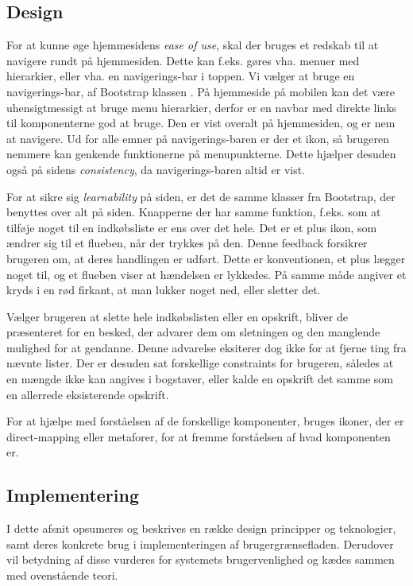 \subsection{Design}
For at kunne øge hjemmesidens \textit{ease of use}, skal der bruges et redskab til at navigere rundt på hjemmesiden.
Dette kan f.eks. gøres vha. menuer med hierarkier, eller vha. en navigerings-bar i toppen.
Vi vælger at bruge en navigerings-bar, af Bootstrap klassen . 
På hjemmeside på mobilen kan det være uhensigtmessigt at bruge menu hierarkier, derfor er en navbar med direkte links til komponenterne god at bruge. 
Den er vist overalt på hjemmesiden, og er nem at navigere.
Ud for alle emner på navigerings-baren er der et ikon, så brugeren nemmere kan genkende funktionerne på menupunkterne.
Dette hjælper desuden også på sidens \textit{consistency}, da navigerings-baren altid er vist.

For at sikre sig \textit{learnability} på siden, er det de samme klasser fra Bootstrap, der benyttes over alt på siden. 
Knapperne der har samme funktion, f.eks. som at tilføje noget til en indkøbsliste er ens over det hele. 
Det er et plus ikon, som ændrer sig til et flueben, når der trykkes på den.
Denne feedback forsikrer brugeren om, at deres handlingen er udført.
Dette er konventionen, et plus lægger noget til, og et flueben viser at hændelsen er lykkedes.
På samme måde angiver et kryds i en rød firkant, at man lukker noget ned, eller sletter det.

Vælger brugeren at slette hele indkøbslisten eller en opskrift, bliver de præsenteret for en besked, der advarer dem om sletningen og den manglende mulighed for at gendanne.
Denne advarelse eksiterer dog ikke for at fjerne ting fra nævnte lister.
Der er desuden sat forskellige constraints for brugeren, således at en mængde ikke kan angives i bogstaver, eller kalde en opskrift det samme som en allerrede eksisterende opskrift.

For at hjælpe med forståelsen af de forskellige komponenter, bruges ikoner, der er direct-mapping eller metaforer, for at fremme forståelsen af hvad komponenten er.
	
\subsection{Implementering}
I dette afsnit opsumeres og beskrives en række design principper og teknologier, samt deres konkrete brug i implementeringen af brugergrænsefladen. 
Derudover vil betydning af disse vurderes for systemets brugervenlighed og kædes sammen med ovenstående teori.

